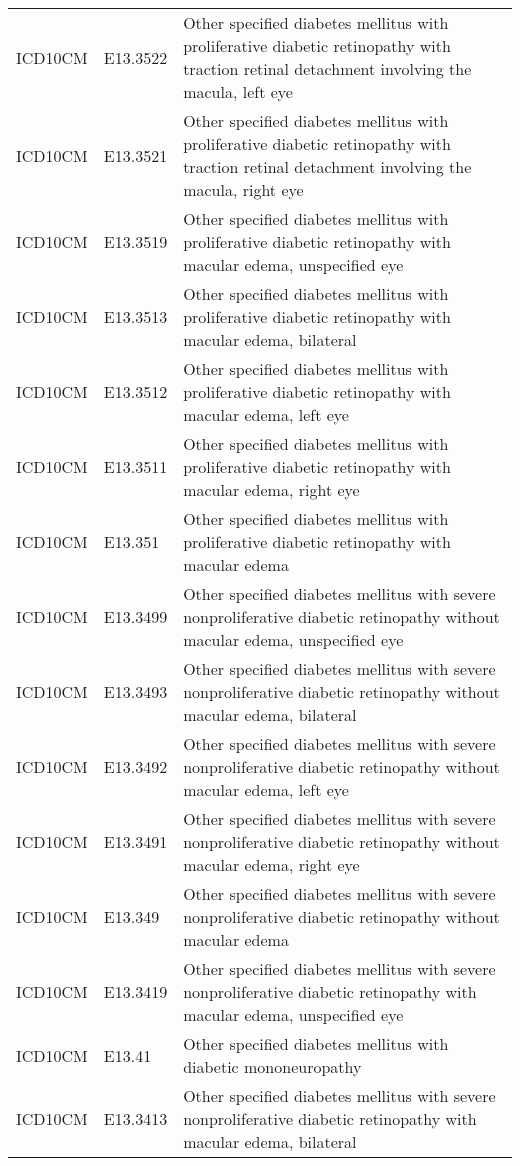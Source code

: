 \begin{table}[ht]
\begin{tabular}{lll}
  ICD10CM & E13.3522 & Other specified diabetes mellitus with proliferative diabetic retinopathy with traction retinal detachment involving the macula, left eye \\ 
  ICD10CM & E13.3521 & Other specified diabetes mellitus with proliferative diabetic retinopathy with traction retinal detachment involving the macula, right eye \\ 
  ICD10CM & E13.3519 & Other specified diabetes mellitus with proliferative diabetic retinopathy with macular edema, unspecified eye \\ 
  ICD10CM & E13.3513 & Other specified diabetes mellitus with proliferative diabetic retinopathy with macular edema, bilateral \\ 
  ICD10CM & E13.3512 & Other specified diabetes mellitus with proliferative diabetic retinopathy with macular edema, left eye \\ 
  ICD10CM & E13.3511 & Other specified diabetes mellitus with proliferative diabetic retinopathy with macular edema, right eye \\ 
  ICD10CM & E13.351 & Other specified diabetes mellitus with proliferative diabetic retinopathy with macular edema \\ 
  ICD10CM & E13.3499 & Other specified diabetes mellitus with severe nonproliferative diabetic retinopathy without macular edema, unspecified eye \\ 
  ICD10CM & E13.3493 & Other specified diabetes mellitus with severe nonproliferative diabetic retinopathy without macular edema, bilateral \\ 
  ICD10CM & E13.3492 & Other specified diabetes mellitus with severe nonproliferative diabetic retinopathy without macular edema, left eye \\ 
  ICD10CM & E13.3491 & Other specified diabetes mellitus with severe nonproliferative diabetic retinopathy without macular edema, right eye \\ 
  ICD10CM & E13.349 & Other specified diabetes mellitus with severe nonproliferative diabetic retinopathy without macular edema \\ 
  ICD10CM & E13.3419 & Other specified diabetes mellitus with severe nonproliferative diabetic retinopathy with macular edema, unspecified eye \\ 
  ICD10CM & E13.41 & Other specified diabetes mellitus with diabetic mononeuropathy \\ 
  ICD10CM & E13.3413 & Other specified diabetes mellitus with severe nonproliferative diabetic retinopathy with macular edema, bilateral \\ 

\end{tabular}
\end{table}
